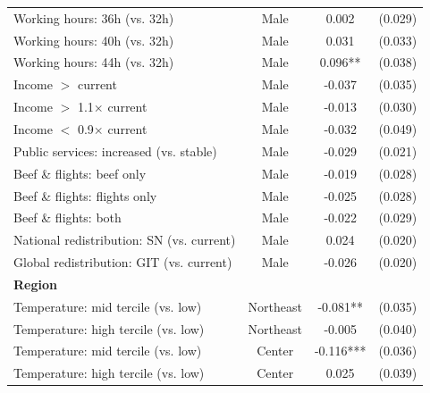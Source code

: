 \begin{table}[H]
\begin{tabular}{ l c c c }
\hspace{0.05cm} Working hours: 36h (vs. 32h) & Male & 0.002 & (0.029) \\
\hspace{0.05cm} Working hours: 40h (vs. 32h) & Male & 0.031 & (0.033) \\
\hspace{0.05cm} Working hours: 44h (vs. 32h) & Male & 0.096** & (0.038) \\
\hspace{0.05cm} Income $>$ current & Male & -0.037 & (0.035) \\
\hspace{0.05cm} Income $>$ 1.1$\times$ current & Male & -0.013 & (0.030) \\
\hspace{0.05cm} Income $<$ 0.9$\times$ current & Male & -0.032 & (0.049) \\
\hspace{0.05cm} Public services: increased (vs. stable) & Male & -0.029 & (0.021) \\
\hspace{0.05cm} Beef \& flights: beef only & Male & -0.019 & (0.028) \\
\hspace{0.05cm} Beef \& flights: flights only & Male & -0.025 & (0.028) \\
\hspace{0.05cm} Beef \& flights: both & Male & -0.022 & (0.029) \\
\hspace{0.05cm} National redistribution: SN (vs. current) & Male & 0.024 & (0.020) \\
\hspace{0.05cm} Global redistribution: GIT (vs. current) & Male & -0.026 & (0.020) \\
\hline
\multicolumn{4}{l}{\textbf{Region}} \\
\hspace{0.05cm} Temperature: mid tercile (vs. low) & Northeast & -0.081** & (0.035) \\
\hspace{0.05cm} Temperature: high tercile (vs. low) & Northeast & -0.005 & (0.040) \\
\hspace{0.05cm} Temperature: mid tercile (vs. low) & Center & -0.116*** & (0.036) \\
\hspace{0.05cm} Temperature: high tercile (vs. low) & Center & 0.025 & (0.039) \\

\end{tabular}
\end{table}
